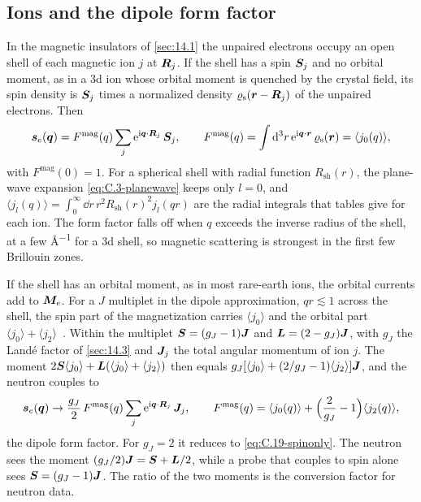 \subsection{Ions and the dipole form factor}

In the magnetic insulators of \cref{sec:14.1} the unpaired electrons occupy an open shell of each magnetic ion $j$ at $\bm{R}_j$. If the shell has a spin $\bm{S}_j$ and no orbital moment, as in a 3d ion whose orbital moment is quenched by the crystal field, its spin density is $\bm{S}_j$ times a normalized density $\varrho_{\mathrm{s}}(\bm{r} - \bm{R}_j)$ of the unpaired electrons. Then
\begin{equation}
  \bm{s}_e(\bm{q}) = F^{\mathrm{mag}}(q)\sum_j\mathrm{e}^{\mathrm{i}\bm{q}\cdot\bm{R}_j}\,\bm{S}_j, \qquad
  F^{\mathrm{mag}}(q) = \int\mathrm{d}^3r\,\mathrm{e}^{\mathrm{i}\bm{q}\cdot\bm{r}}\,\varrho_{\mathrm{s}}(\bm{r}) = \langle j_0(q)\rangle ,
  \label{eq:C.19-spinonly}
\end{equation}
with $F^{\mathrm{mag}}(0) = 1$. For a spherical shell with radial function $R_{\mathrm{sh}}(r)$, the plane-wave expansion \cref{eq:C.3-planewave} keeps only $l = 0$, and $\langle j_l(q)\rangle = \int_0^\infty\dd r\,r^2R_{\mathrm{sh}}(r)^2j_l(qr)$ are the radial integrals that tables give for each ion. The form factor falls off when $q$ exceeds the inverse radius of the shell, at a few \si{\angstrom^{-1}} for a 3d shell, so magnetic scattering is strongest in the first few Brillouin zones.

If the shell has an orbital moment, as in most rare-earth ions, the orbital currents add to $\bm{M}_e$. For a $J$ multiplet in the dipole approximation, $qr \lesssim 1$ across the shell, the spin part of the magnetization carries $\langle j_0\rangle$ and the orbital part $\langle j_0\rangle + \langle j_2\rangle$~\cite[Chap.~7]{squires2012introduction}. Within the multiplet $\bm{S} = (g_J - 1)\bm{J}$ and $\bm{L} = (2 - g_J)\bm{J}$, with $g_J$ the Landé factor of \cref{sec:14.3} and $\bm{J}_j$ the total angular momentum of ion $j$. The moment $2\bm{S}\langle j_0\rangle + \bm{L}(\langle j_0\rangle + \langle j_2\rangle)$ then equals $g_J[\langle j_0\rangle + (2/g_J - 1)\langle j_2\rangle]\bm{J}$, and the neutron couples to
\begin{equation}
  \bm{s}_e(\bm{q}) \to \frac{g_J}{2}\,F^{\mathrm{mag}}(q)\sum_j\mathrm{e}^{\mathrm{i}\bm{q}\cdot\bm{R}_j}\,\bm{J}_j, \qquad
  F^{\mathrm{mag}}(q) = \langle j_0(q)\rangle + \Bigl(\frac{2}{g_J} - 1\Bigr)\langle j_2(q)\rangle ,
  \label{eq:C.19-dipole}
\end{equation}
the dipole form factor. For $g_J = 2$ it reduces to \cref{eq:C.19-spinonly}. The neutron sees the moment $(g_J/2)\bm{J} = \bm{S} + \bm{L}/2$, while a probe that couples to spin alone sees $\bm{S} = (g_J - 1)\bm{J}$. The ratio of the two moments is the conversion factor for neutron data.

